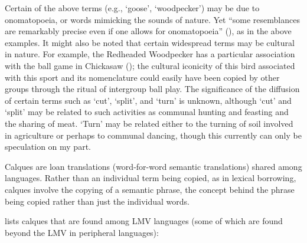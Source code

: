 \documentclass[output=paper]{LSP/langsci}
\begin{document}
Certain of the above terms (e.g., `goose', `woodpecker') may be due to ono\-ma\-to\-poeia, or words mimicking the sounds of nature. Yet “some resemblances are remarkably precise even if one allows for onomatopoeia” (\citealt[82]{Haas1969}), as in the above examples. It might also be noted that certain widespread terms may be cultural in nature. For example, the Redheaded Woodpecker has a particular association with the ball game in Chickasaw (\citealt[34--37]{Galvan2011}); the cultural iconicity of this bird associated with this sport and its nomenclature could easily have been copied by other groups through the ritual of intergroup ball play. The significance of the diffusion of certain terms such as `cut', `split', and `turn' is unknown, although `cut' and `split' may be related to such activities as communal hunting and feasting and the sharing of meat. `Turn' may be related either to the turning of soil involved in agriculture or perhaps to communal dancing, though this currently can only be speculation on my part. 

Calques are loan translations (word-for-word semantic translations) shared among languages. Rather than an individual term being copied, as in lexical borrowing, calques involve the copying of a semantic phrase, the concept behind the phrase being copied rather than just the individual words.

 lists calques that are found among LMV languages (some of which are found beyond the LMV in peripheral languages): 
\end{document}
